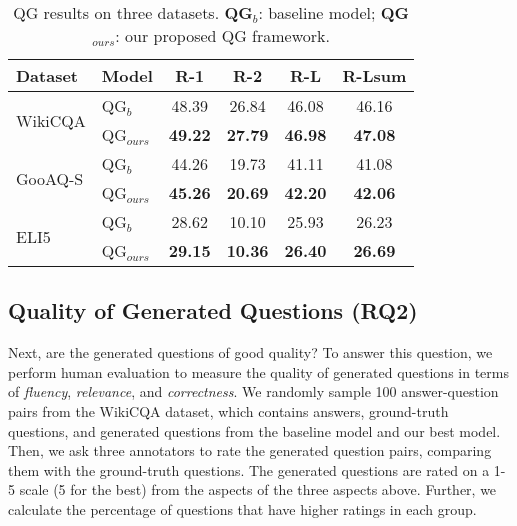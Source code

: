 \documentclass[11pt]{article}
\begin{document}
\begin{table}[htbp!]
\centering\small
\begin{tabular}{p{1cm}p{0.8cm}cccc}
\hline
\textbf{Dataset} & \textbf{Model} & \textbf{R-1} & \textbf{R-2} & \textbf{R-L} & \textbf{R-Lsum} \\
\hline
\multirow{2}{*}{WikiCQA} & QG$_{b}$ & 48.39 & 26.84 & 46.08 & 46.16  \\
                         & QG$_{ours}$ & \textbf{49.22} & \textbf{27.79} & \textbf{46.98} & \textbf{47.08} \\\hline
\multirow{2}{*}{GooAQ-S} & QG$_{b}$ & 44.26 & 19.73 & 41.11 & 41.08 \\
                       & QG$_{ours}$ & \textbf{45.26} & \textbf{20.69} & \textbf{42.20} & \textbf{42.06} \\\hline
\multirow{2}{*}{ELI5} & QG$_{b}$ & 28.62 & 10.10 & 25.93 & 26.23 \\
                      & QG$_{ours}$ & \textbf{29.15} & \textbf{10.36} & \textbf{26.40} & \textbf{26.69} \\
\hline
\end{tabular}
\caption{QG results on three datasets. \textbf{QG$_{b}$}: baseline model; \textbf{QG$_{ours}$}: our proposed QG framework.}
\label{tab:qg-results}
\end{table}
\subsection{Quality of Generated Questions (RQ2)}
Next, are the generated questions of good quality? To answer this question, we perform human evaluation to measure the quality of generated questions in terms of \textit{fluency}, \textit{relevance}, and \textit{correctness}.
We randomly sample 100 answer-question pairs from the WikiCQA dataset, which contains answers, ground-truth questions, and generated questions from the baseline model and our best model. 
Then, we ask three annotators to rate the generated question pairs, comparing them with the ground-truth questions.
The generated questions are rated on a 1-5 scale (5 for the best) from the aspects of the three aspects above.
Further, we calculate the percentage of questions that have higher ratings in each group.
\end{document}
